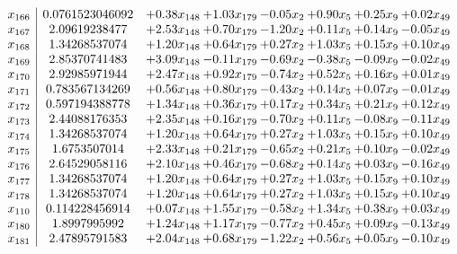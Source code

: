 \documentclass[8pt]{article}
\begin{document}
\[\begin{array}{c| c c@{\hskip 2pt} c@{\hskip 2pt} c@{\hskip 2pt} c@{\hskip 2pt} c@{\hskip 2pt} c@{\hskip 2pt} }
 x_{166}   &  0.0761523046092 & +  0.38 x_{148} & +  1.03 x_{179} & -0.05 x_{2} & +  0.90 x_{5} & +  0.25 x_{9} & +  0.02 x_{49}\\
 x_{167}   &  2.09619238477 & +  2.53 x_{148} & +  0.70 x_{179} & -1.20 x_{2} & +  0.11 x_{5} & +  0.14 x_{9} & -0.05 x_{49}\\
 x_{168}   &  1.34268537074 & +  1.20 x_{148} & +  0.64 x_{179} & +  0.27 x_{2} & +  1.03 x_{5} & +  0.15 x_{9} & +  0.10 x_{49}\\
 x_{169}   &  2.85370741483 & +  3.09 x_{148} & -0.11 x_{179} & -0.69 x_{2} & -0.38 x_{5} & -0.09 x_{9} & -0.02 x_{49}\\
 x_{170}   &  2.92985971944 & +  2.47 x_{148} & +  0.92 x_{179} & -0.74 x_{2} & +  0.52 x_{5} & +  0.16 x_{9} & +  0.01 x_{49}\\
 x_{171}   &  0.783567134269 & +  0.56 x_{148} & +  0.80 x_{179} & -0.43 x_{2} & +  0.14 x_{5} & +  0.07 x_{9} & -0.01 x_{49}\\
 x_{172}   &  0.597194388778 & +  1.34 x_{148} & +  0.36 x_{179} & +  0.17 x_{2} & +  0.34 x_{5} & +  0.21 x_{9} & +  0.12 x_{49}\\
 x_{173}   &  2.44088176353 & +  2.35 x_{148} & +  0.16 x_{179} & -0.70 x_{2} & +  0.11 x_{5} & -0.08 x_{9} & -0.11 x_{49}\\
 x_{174}   &  1.34268537074 & +  1.20 x_{148} & +  0.64 x_{179} & +  0.27 x_{2} & +  1.03 x_{5} & +  0.15 x_{9} & +  0.10 x_{49}\\
 x_{175}   &  1.6753507014 & +  2.33 x_{148} & +  0.21 x_{179} & -0.65 x_{2} & +  0.21 x_{5} & +  0.10 x_{9} & -0.02 x_{49}\\
 x_{176}   &  2.64529058116 & +  2.10 x_{148} & +  0.46 x_{179} & -0.68 x_{2} & +  0.14 x_{5} & +  0.03 x_{9} & -0.16 x_{49}\\
 x_{177}   &  1.34268537074 & +  1.20 x_{148} & +  0.64 x_{179} & +  0.27 x_{2} & +  1.03 x_{5} & +  0.15 x_{9} & +  0.10 x_{49}\\
 x_{178}   &  1.34268537074 & +  1.20 x_{148} & +  0.64 x_{179} & +  0.27 x_{2} & +  1.03 x_{5} & +  0.15 x_{9} & +  0.10 x_{49}\\
 x_{110}   &  0.114228456914 & +  0.07 x_{148} & +  1.55 x_{179} & -0.58 x_{2} & +  1.34 x_{5} & +  0.38 x_{9} & +  0.03 x_{49}\\
 x_{180}   &  1.8997995992 & +  1.24 x_{148} & +  1.17 x_{179} & -0.77 x_{2} & +  0.45 x_{5} & +  0.09 x_{9} & -0.13 x_{49}\\
 x_{181}   &  2.47895791583 & +  2.04 x_{148} & +  0.68 x_{179} & -1.22 x_{2} & +  0.56 x_{5} & +  0.05 x_{9} & -0.10 x_{49}\\

\end{array}\]
\end{document}
